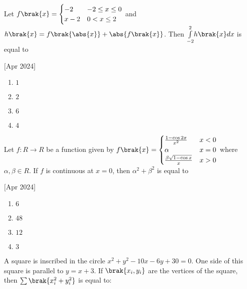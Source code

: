 \iffalse
	\title{2024}
	\author{AI24BTECH11003}
	\section{mcq-single}
\fi

    \item Let $
    f\brak{x}=
    \begin{cases}
    -2 & -2\leq x \leq 0\\
    x-2 & 0 < x \leq2
    \end{cases}$ and $h\brak{x}=f\brak{\abs{x}}+\abs{f\brak{x}}$. Then $\underset{-2}{\overset{2}{\int}}h\brak{x} dx$ is equal to
    
    \hfill[Apr 2024]

        \begin{multicols}{4}
            \begin{enumerate}
                \item $1$
                \item $2$
                \item $6$
                \item $4$
            \end{enumerate}
        \end{multicols}

    \item Let $f:R\to R$ be a function given by 
    $f\brak{x}=
    \begin{cases}
        \frac{1-\cos2x}{x^2} & x<0\\
        \alpha & x=0\\
        \frac{\beta\sqrt{1-\cos x}}{x} & x>0
    \end{cases}$ where $\alpha,\beta\in R$. If $f$ is continuous at $x=0$, then $\alpha^2+\beta^2$ is equal to
    
    \hfill[Apr 2024]

		\begin{multicols}{4}
			\begin{enumerate}
				\item $6$
				\item $48$
				\item $12$
				\item $3$
			\end{enumerate}
		\end{multicols}

    \item A square is inscribed in the circle $x^2+y^2-10x-6y+30=0$. One side of this square is parallel to $y=x+3$. If $\brak{x_i,y_i}$ are the vertices of the square, then $\sum\brak{x_i^2+y_i^2}$ is equal to:
    
